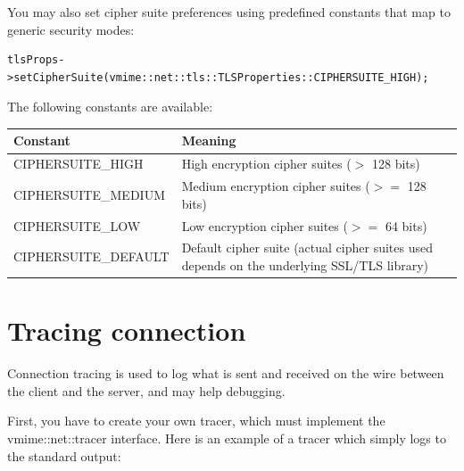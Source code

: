 
You may also set cipher suite preferences using predefined constants that
map to generic security modes:

\begin{lstlisting}[caption={Setting TLS cipher suite preferences using predefined modes}]
tlsProps->setCipherSuite(vmime::net::tls::TLSProperties::CIPHERSUITE_HIGH);
\end{lstlisting}

The following constants are available:

\noindent\begin{tabularx}{1.0\textwidth}{|l|X|}
\hline
	{\bf Constant} &
	{\bf Meaning} \\
\hline
	CIPHERSUITE\_HIGH &
	High encryption cipher suites ($>$ 128 bits) \\
\hline
	CIPHERSUITE\_MEDIUM &
	Medium encryption cipher suites ($>=$ 128 bits) \\
\hline
	CIPHERSUITE\_LOW &
	Low encryption cipher suites ($>=$ 64 bits) \\
\hline
	CIPHERSUITE\_DEFAULT &
	Default cipher suite (actual cipher suites used depends
	on the underlying SSL/TLS library) \\
\hline
\end{tabularx}


\section{Tracing connection}

Connection tracing is used to log what is sent and received on the wire
between the client and the server, and may help debugging.

First, you have to create your own tracer, which must implement the
{\vcode vmime::net::tracer} interface. Here is an example of a tracer which
simply logs to the standard output:

